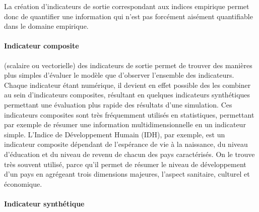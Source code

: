 La création d'indicateurs de sortie correspondant aux indices empirique permet donc de quantifier une information qui n'est pas forcément aisément quantifiable dans le domaine empirique.

\paragraph{Indicateur composite}

(scalaire ou vectorielle) des indicateurs de sortie permet de trouver des manières plus simples d'évaluer le modèle que d'observer l'ensemble des indicateurs.
Chaque indicateur étant numérique, il devient en effet possible des les combiner au sein d'indicateurs composites, résultant en quelques indicateurs synthétiques permettant une évaluation plus rapide des résultats d'une simulation.
Ces indicateurs composites sont très fréquemment utilisés en statistiques, permettant par exemple de résumer une information multidimensionnelle en un indicateur simple.
L'Indice de Développement Humain (IDH), par exemple, est un indicateur composite dépendant de l'espérance de vie à la naissance, du niveau d'éducation et du niveau de revenu de chacun des pays caractérisés.
On le trouve très souvent utilisé, parce qu'il permet de résumer le niveau de développement d'un pays en agrégeant trois dimensions majeures, l'aspect sanitaire, culturel et économique.

\paragraph{Indicateur synthétique}

